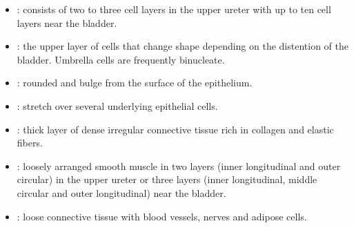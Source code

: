 \begin{multicols}{2}
\begin{itemize}
  \item {}: consists of two to three cell layers in the upper ureter with up to ten cell layers near the bladder. 
  
  \begin{center}
  \end{center}
  
  \item {}: the upper layer of cells that change shape depending on the distention of the bladder. Umbrella cells are frequently binucleate. 
  
  \begin{center}
  \end{center}
  
  \item {}: rounded and bulge from the surface of the epithelium.
  
  \begin{center}
  \end{center}
  
  \item {}: stretch over several underlying epithelial cells.
  
  \begin{center}
  \end{center}
  
  \item {}: thick layer of dense irregular connective tissue rich in collagen and elastic fibers.
  
  \begin{center}
  \end{center}
   
  \item {}: loosely arranged smooth muscle in two layers (inner longitudinal and outer circular) in the upper ureter or three layers (inner longitudinal, middle circular and outer longitudinal) near the bladder.
  
  \begin{center}
  \end{center}
  
  \item {}: loose connective tissue with blood vessels, nerves and adipose cells.
  
  \begin{center}
  \end{center}
  
\end{itemize}
\end{multicols}